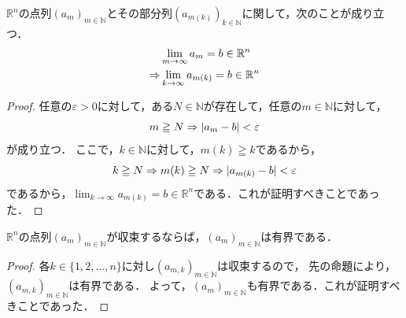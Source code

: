\begin{theorem}{}{}
  $\mathbb{R}^n$の点列$(a_m)_{m \in \mathbb{N}}$とその部分列$(a_{m(k)})_{k \in \mathbb{N}}$に関して，次のことが成り立つ．
  \begin{align*}
    &\lim_{m \to \infty} a_m = b \in \mathbb{R}^n \\
    \mathrel{\Rightarrow} & \lim_{k \to \infty} a_{m(k)} = b \in \mathbb{R}^n
  \end{align*}
\end{theorem}

\begin{leftbar}
\begin{proof}
  任意の$\varepsilon >0$に対して，ある$N \in \mathbb{N}$が存在して，任意の$m \in \mathbb{N}$に対して，
  \[
    m \geqq N \mathrel{\Rightarrow} \lvert a_m -b\rvert < \varepsilon
  \]
  が成り立つ．
  ここで，$k \in \mathbb{N}$に対して，$m(k) \geqq k$であるから，
  \[
    k \geqq N \mathrel{\Rightarrow} m(k) \geqq N \mathrel{\Rightarrow} \lvert a_{m(k)} -b\rvert < \varepsilon
  \]
  であるから，$\lim_{k \to \infty} a_{m(k)} = b \in \mathbb{R}^n$である．これが証明すべきことであった．
\end{proof}
\end{leftbar}

\begin{theorem}{}{}
  $\mathbb{R}^n$の点列$(a_m)_{m \in \mathbb{N}}$が収束するならば，$(a_m)_{m \in \mathbb{N}}$は有界である．
\end{theorem}

\begin{leftbar}
  \begin{proof}
    各$k \in \{ 1,2,\ldots,n \}$に対し$(a_{m,k})_{m \in \mathbb{N}}$は収束するので，
    先の命題により，$(a_{m,k})_{m \in \mathbb{N}}$は有界である．
    よって，$(a_m)_{m \in \mathbb{N}}$も有界である．これが証明すべきことであった．
  \end{proof}
\end{leftbar}
